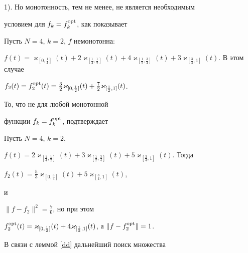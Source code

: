1). Но монотонность, тем не менее, не является необходимым


условием для $f_k=f_k^{\operatorname{opt}}$, как показывает








\begin{exam}


Пусть $N=4$, $k=2$, $f$ немонотонна:


$f(t)=\varkappa_{[0,\frac{1}{4}]}(t)+


2\varkappa_{[\frac{1}{4},\frac{1}{2}]}(t)+


4\varkappa_{[\frac{1}{2},\frac{3}{4}]}(t)+


3\varkappa_{[\frac{3}{4},1]}(t)$. В этом случае


$f_2(t)=f_2^{\opt}(t)=\frac{3}{2}


\varkappa_{[0,\frac{1}{2}]}(t)+\frac{7}{2}\varkappa_{[\frac{1}{2},1]}(t)$.


\end{exam}





То, что не для любой монотонной


функции $f_k=f_k^{\operatorname{opt}}$, подтверждает





\begin{exam}


Пусть $N=4$, $k=2$,


$f(t)=2\varkappa_{[\frac{1}{4},\frac{1}{2}]}(t)+


3\varkappa_{[\frac{1}{2},\frac{3}{4}]}(t)+


5\varkappa_{[\frac{3}{4},1]}(t)$. Тогда


$f_2(t)=\frac{5}{3}\varkappa_{[0,\frac{3}{4}]}(t)+


5\varkappa_{[\frac{3}{4},1]}(t)$,


и


$\|f-f_2\|^2=\frac{7}{6}$, но при этом


$f_2^{\opt}(t)=\varkappa_{[0,\frac{1}{2}]}(t)+4


\varkappa_{[\frac{1}{2},1]}(t)$, а $\|f-f_2^{\opt}\|=1$.


\end{exam}





В связи с леммой \ref{dd} дальнейший поиск множества



